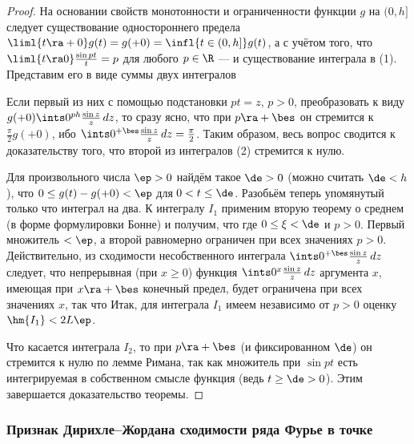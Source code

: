 \documentclass[a4paper]{article}
\begin{document}
\begin{proof}
На основании свойств монотонности и ограниченности функции $g$ на
$(0,h]$ следует существование одностороннего предела $\liml{t\ra+0}
g(t) = g(+0) = \infl{t\in(0,h]} g(t)$, а с учётом того, что
$\liml{t\ra0} \frac{\sin pt}{t}=p$ для любого $p\in\R$ --- и
существование интеграла в (1). Представим его в виде суммы двух
интегралов 

Если первый из них с помощью подстановки $pt=z$, $p>0$,
преобразовать к виду $g(+0) \ints0^{ph} \frac{\sin z}z\,dz$, то
сразу ясно, что при $p\ra+\bes$ он стремится к $\frac{\pi}2g(+0)$,
ибо $\ints0^{+\bes} \frac{\sin z}z\,dz=\frac{\pi}2$. Таким образом,
весь вопрос сводится к доказательству того, что второй из интегралов
(2) стремится к нулю.

Для произвольного числа $\ep>0$ найдём такое $\de>0$ (можно считать
$\de<h$), что $0\le g(t) - g(+0)<\ep$ для $0<t\le\de$. Разобьём
теперь упомянутый только что интеграл на два.  К
интегралу $I_1$ применим вторую теорему о среднем (в форме
формулировки Бонне) и получим, что  где $0\le\xi < \de$ и $p>0$. Первый
множитель $<\ep$, а второй равномерно ограничен при всех значениях
$p>0$. Действительно, из сходимости несобственного интеграла
$\ints0^{+\bes} \frac{\sin z}z\,dz$ следует, что непрерывная (при
$x\ge0$) функция $\ints0^x \frac{\sin z}z\,dz$ аргумента $x$,
имеющая при $x\ra+\bes$ конечный предел, будет ограничена при всех
значениях $x$,  так что  Итак, для интеграла $I_1$ имеем
независимо от $p>0$ оценку $\hm{I_1} < 2L\ep$.

Что касается интеграла $I_2$, то при $p\ra+\bes$ (и фиксированном
$\de$) он стремится к нулю по лемме Римана, так как множитель при
$\sin pt$ есть интегрируемая в собственном смысле функция (ведь
$t\ge\de>0$). Этим завершается доказательство теоремы.
\end{proof}

\subsubsection{Признак Дирихле--Жордана сходимости ряда Фурье в
точке}
\end{document}
